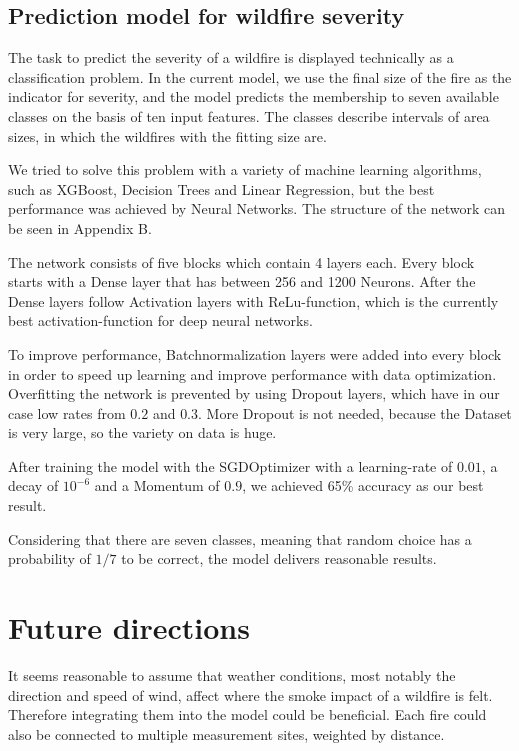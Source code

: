 \documentclass[a4paper,12pt]{article}
\begin{document}
\subsection{Prediction model for wildfire severity}

The task to predict the severity of a wildfire is displayed technically as a classification problem. In the current model, we use the final size of the fire as the indicator for severity, and the model predicts the membership to seven available classes on the basis of ten input features. The classes describe intervals of area sizes, in which the wildfires with the fitting size are.

We tried to solve this problem with a variety of machine learning algorithms, such as XGBoost, Decision Trees and Linear Regression, but the best performance was achieved by Neural Networks. The structure of the network can be seen in Appendix B.

The network consists of five blocks which contain 4 layers each. Every block starts with a Dense layer that has between 256 and 1200 Neurons. After the Dense layers follow Activation layers with ReLu-function, which is the currently best activation-function for deep neural networks.

To improve performance, Batchnormalization layers were added into every block in order to speed up learning and improve performance with data optimization. Overfitting the network is prevented by using Dropout layers, which have in our case low rates from $0.2$ and $0.3$. More Dropout is not needed, because the Dataset is very large, so the variety on data is huge.

After training the model with the SGDOptimizer with a learning-rate of $0.01$, a decay of $10^{-6}$ and a Momentum of $0.9$, we achieved 65\% accuracy as our best result.

Considering that there are seven classes, meaning that random choice has a probability of $1/7$ to be correct, the model delivers reasonable results.

\section{Future directions}

It seems reasonable to assume that weather conditions, most notably the direction and speed of wind, affect where the smoke impact of a wildfire is felt. Therefore integrating them into the model could be beneficial. Each fire could also be connected to multiple measurement sites, weighted by distance.
\end{document}
